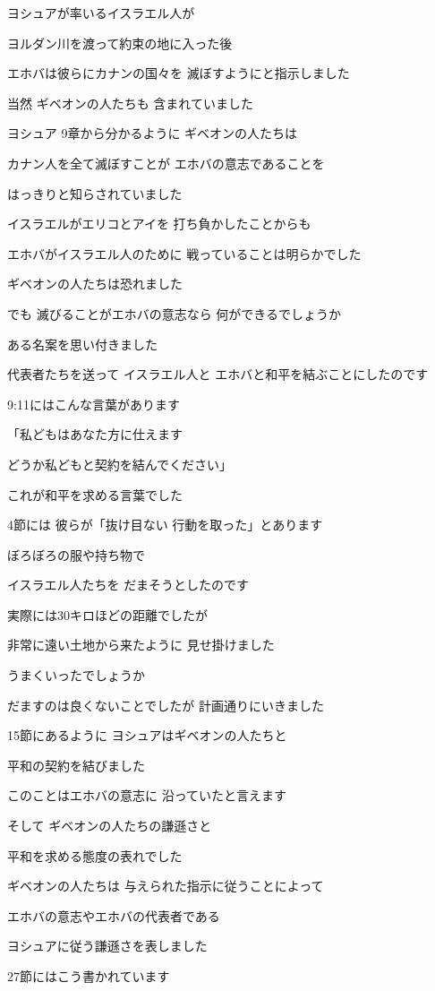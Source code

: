 \documentclass[twocolumn]{jsarticle}
\begin{document}
ヨシュアが率いるイスラエル人が

ヨルダン川を渡って約束の地に入った後

エホバは彼らにカナンの国々を
滅ぼすようにと指示しました

当然 ギベオンの人たちも
含まれていました

ヨシュア 9章から分かるように
ギベオンの人たちは

カナン人を全て滅ぼすことが
エホバの意志であることを

はっきりと知らされていました

イスラエルがエリコとアイを
打ち負かしたことからも

エホバがイスラエル人のために
戦っていることは明らかでした

ギベオンの人たちは恐れました

でも 滅びることがエホバの意志なら
何ができるでしょうか

ある名案を思い付きました

代表者たちを送って イスラエル人と
エホバと和平を結ぶことにしたのです

9:11にはこんな言葉があります

「私どもはあなた方に仕えます

どうか私どもと契約を結んでください」

これが和平を求める言葉でした

4節には 彼らが「抜け目ない
行動を取った」とあります

ぼろぼろの服や持ち物で

イスラエル人たちを
だまそうとしたのです

実際には30キロほどの距離でしたが

非常に遠い土地から来たように
見せ掛けました

うまくいったでしょうか

だますのは良くないことでしたが
計画通りにいきました

15節にあるように
ヨシュアはギベオンの人たちと

平和の契約を結びました

このことはエホバの意志に
沿っていたと言えます

そして ギベオンの人たちの謙遜さと

平和を求める態度の表れでした

ギベオンの人たちは
与えられた指示に従うことによって

エホバの意志やエホバの代表者である

ヨシュアに従う謙遜さを表しました

27節にはこう書かれています
\end{document}
